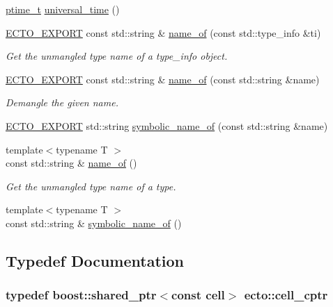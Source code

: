 \begin{DoxyCompactItemize}
\hyperlink{namespaceecto_a5bbe8fb0da047cb18d92eb9dfb469652}{ptime\+\_\+t} \hyperlink{namespaceecto_ad48a07c99914e7c96702bcce4baf6bc6}{universal\+\_\+time} ()
\item 
\hyperlink{util_8hpp_ab55b7868679cda60fc162580957fb98c}{E\+C\+T\+O\+\_\+\+E\+X\+P\+O\+RT} const std\+::string \& \hyperlink{namespaceecto_a980294f61090496ef65bc6b201f38944}{name\+\_\+of} (const std\+::type\+\_\+info \&ti)
\begin{DoxyCompactList}\small\item\em Get the unmangled type name of a type\+\_\+info object. \end{DoxyCompactList}\item 
\hyperlink{util_8hpp_ab55b7868679cda60fc162580957fb98c}{E\+C\+T\+O\+\_\+\+E\+X\+P\+O\+RT} const std\+::string \& \hyperlink{namespaceecto_ae8640f8758655b241efbd681cef5727f}{name\+\_\+of} (const std\+::string \&name)
\begin{DoxyCompactList}\small\item\em Demangle the given name. \end{DoxyCompactList}\item 
\hyperlink{util_8hpp_ab55b7868679cda60fc162580957fb98c}{E\+C\+T\+O\+\_\+\+E\+X\+P\+O\+RT} std\+::string \hyperlink{namespaceecto_a56b14793c548143a90d5bff5a7c279b8}{symbolic\+\_\+name\+\_\+of} (const std\+::string \&name)
\item 
{\footnotesize template$<$typename T $>$ }\\const std\+::string \& \hyperlink{namespaceecto_a2420930e76b8e95a3f241c4dc154f8f8}{name\+\_\+of} ()
\begin{DoxyCompactList}\small\item\em Get the unmangled type name of a type. \end{DoxyCompactList}\item 
{\footnotesize template$<$typename T $>$ }\\const std\+::string \& \hyperlink{namespaceecto_a1df1f18305fe27e87f2a845d02f31db9}{symbolic\+\_\+name\+\_\+of} ()
\end{DoxyCompactItemize}


\subsection{Typedef Documentation}
\subsubsection[{\texorpdfstring{cell\+\_\+cptr}{cell_cptr}}]{\setlength{\rightskip}{0pt plus 5cm}typedef boost\+::shared\+\_\+ptr$<$const {\bf cell}$>$ {\bf ecto\+::cell\+\_\+cptr}}\hypertarget{namespaceecto_ab708c826226c91fd6f3c8c121f293a78}{}\label{namespaceecto_ab708c826226c91fd6f3c8c121f293a78}
